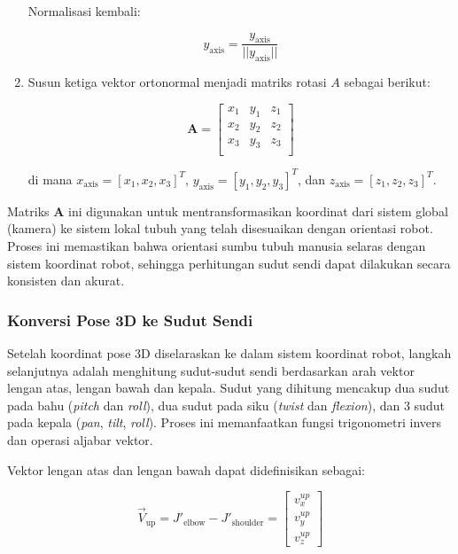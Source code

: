 \begin{enumerate}
    Normalisasi kembali:
    
    \begin{equation}
    {y}_{\text{axis}} = \frac{{y}_{\text{axis}}}{||{y}_{\text{axis}}||}
    \end{equation}
    
    \item Susun ketiga vektor ortonormal menjadi matriks rotasi $A$ sebagai berikut:
    
    \begin{equation}
    \mathbf{A} =
    \begin{bmatrix}
    x_1 & y_1 & z_1 \\
    x_2 & y_2 & z_2 \\
    x_3 & y_3 & z_3 \\
    \end{bmatrix}
    \end{equation}
    
    di mana ${x}_{\text{axis}} = [x_1, x_2, x_3]^T$, ${y}_{\text{axis}} = [y_1, y_2, y_3]^T$, dan ${z}_{\text{axis}} = [z_1, z_2, z_3]^T$.
\end{enumerate}


Matriks $\mathbf{A}$ ini digunakan untuk mentransformasikan koordinat dari sistem global (kamera) ke sistem lokal tubuh yang telah disesuaikan dengan orientasi robot. Proses ini memastikan bahwa orientasi sumbu tubuh manusia selaras dengan sistem koordinat robot, sehingga perhitungan sudut sendi dapat dilakukan secara konsisten dan akurat.


\subsubsection{Konversi Pose 3D ke Sudut Sendi}

Setelah koordinat pose 3D diselaraskan ke dalam sistem koordinat robot, langkah selanjutnya adalah menghitung sudut-sudut sendi berdasarkan arah vektor lengan atas, lengan bawah dan kepala. Sudut yang dihitung mencakup dua sudut pada bahu (\textit{pitch} dan \textit{roll}), dua sudut pada siku (\textit{twist} dan \textit{flexion}), dan 3 sudut pada kepala (\textit{pan}, \textit{tilt}, \textit{roll}). Proses ini memanfaatkan fungsi trigonometri invers dan operasi aljabar vektor.

Vektor lengan atas dan lengan bawah dapat didefinisikan sebagai:

\begin{equation}
\vec{V}_{\text{up}} = J'_{\text{elbow}} - J'_{\text{shoulder}} = 
\begin{bmatrix}
v^{up}_x \\
v^{up}_y \\
v^{up}_z
\end{bmatrix}
\end{equation}

